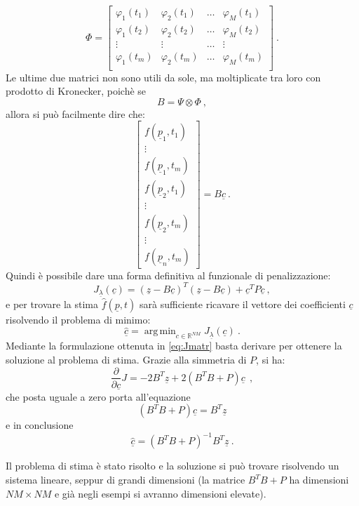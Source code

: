 \documentclass[a4paper,11pt,twoside,openright]{book}							%
\DeclareMathOperator*{\argmin}{arg\,min}
\begin{document}
$$
\Phi = 
\begin{bmatrix}
\varphi_{1}( t_1) & \varphi_{2}( t_1) & \hdots & \varphi_{M}( t_1)  \\
\varphi_{1}( t_2) & \varphi_{2}( t_2) & \hdots & \varphi_{M}( t_2)  \\
\vdots & \vdots & \hdots & \vdots \\
\varphi_{1}( t_m) & \varphi_{2}( t_m) & \hdots & \varphi_{M}( t_m)  \\
\end{bmatrix} \ .
$$
Le ultime due matrici non sono utili da sole, ma moltiplicate tra loro con prodotto di Kronecker, poichè se
$$ B = \Psi \otimes \Phi \ ,$$
allora si può facilmente dire che:
$$
\begin{bmatrix}
f(\underline p_1,t_1)  \\
\vdots\\
f(\underline p_1,t_m)  \\
f(\underline p_2,t_1)  \\
\vdots\\
f(\underline p_2,t_m)  \\
\vdots\\
f(\underline p_n,t_m)
\end{bmatrix}= B \underline c \ .
$$
Quindi è possibile dare una forma definitiva al funzionale di penalizzazione:
\begin{equation} 
\label{eq:Jmatr}
J_{\underline \lambda }(\underline c) = (\underline z - B \underline c)^T (\underline z - B \underline c) + \underline c^T P \underline c \ ,
\end{equation}
e per trovare la stima $\hat{f}(\underline{p},t)$ sarà sufficiente ricavare il vettore dei coefficienti $\underline c$ risolvendo il problema di minimo:
$$
\hat{\underline{c}}=\argmin_{c \in \mathbb{R}^{NM}} J_{\underline \lambda }(\underline c) \ .
$$
Mediante la formulazione ottenuta in \ref{eq:Jmatr} basta derivare per ottenere la soluzione al problema di stima. Grazie alla simmetria di $P$, si ha:
$$
\frac{\partial}{\partial \underline c}J= -2 B^T \underline z + 2(B^T B + P) \underline c \ \ ,
$$
che posta uguale a zero porta all'equazione
$$
(B^T B + P) \underline c = B^T\underline z
$$ 
e in conclusione
\begin{equation}
\label{eq:sysnocovar}
\hat  {\underline c} = (B^T B + P)^{-1}B^T \underline z \ .
\end{equation} 

Il problema di stima è stato risolto e la soluzione si può trovare risolvendo un sistema lineare, seppur di grandi dimensioni (la matrice $B^T B + P$ ha dimensioni $NM \times NM$ e già negli esempi si avranno dimensioni elevate).
\end{document}
